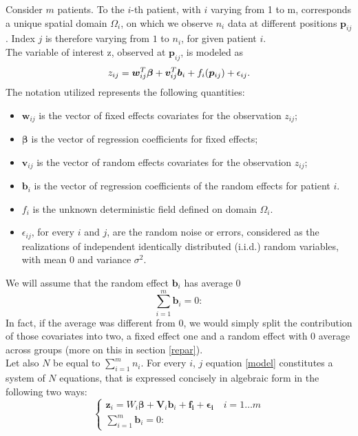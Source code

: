 Consider $m$ patients. To the $i$-th patient, with $i$ varying from 1 to m,
corresponds a unique spatial domain $\Omega_i$, on which we observe $n_i$ data
at different positions $\bm{p}_{ij}$. Index $j$ is therefore varying from $1$
to $n_i$, for given patient $i$.\\The variable of interest z, observed at
$\bm{p}_{ij}$, is modeled as
\begin{equation}
	\label{model}
	z_{ij} = \bm{w}^T_{ij} \bm{\beta} + \bm{v}^T_{ij} \bm{b}_i + f_i(\bm{p_}{ij}) + \epsilon_{ij}.
\end{equation}
The notation utilized represents the following quantities:
\begin{itemize}
	\item $\bm{w}_{ij}$ is the vector of fixed effects covariates for the observation $z_{ij}$;
	\item $\bm{\beta}$ is the vector of regression coefficients for fixed effects;
	\item $\bm{v}_{ij}$ is the vector of random effects covariates for the observation $z_{ij}$;
	\item $\bm{b}_i$ is the vector of regression coefficients of the random
	      effects for patient $i$.
	\item $f_i$ is the unknown deterministic field defined on domain
	      $\Omega_i$.
	\item $\epsilon_{ij}$, for every $i$ and $j$, are the random noise or errors, considered as the realizations of independent identically distributed (i.i.d.) random variables, with mean $0$ and variance $\sigma^2$.
\end{itemize}
We will assume that the random effect $\bm{b}_i$ has average $0$
\begin{equation}
	\label{constraint}
	\sum_{i=1}^{m}{\bm{b}_i}=0:
\end{equation}
In fact, if the average was different from 0, we would simply split
the contribution of those covariates into two, a fixed effect one and a random
effect with 0 average across groups (more on this in section \ref{repar}). \\
Let also $N$ be equal to $\sum_{i=1}^{m}n_i$. For every $i$, $j$ equation
\ref{model} constitutes a system of $N$ equations, that is expressed concisely
in algebraic form in the following two ways:
\begin{equation}
	\begin{cases}
		\bm{z}_i = W_i \bm{\beta} + \bm{V}_i \bm{b}_i + \bm{f_i} + \bm{\epsilon_i} \quad
		i=1 \dots m \\
		\sum_{i=1}^{m}{\bm{b}_i}=0:
	\end{cases}
\end{equation}
